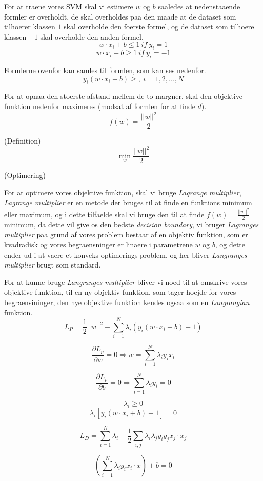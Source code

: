 \documentclass{article}
\begin{document}
For at traene vores SVM skal vi estimere $w$ og $b$ saaledes at nedenstaaende formler er overholdt, de skal overholdes paa den maade at de dataset som tilhoerer klassen $1$ skal overholde den foerste formel, og de dataset som tilhoere klassen $-1$ skal overholde den anden formel. 
$$w \cdot x_i + b \leq 1 \ if \ y_i = 1$$
$$w \cdot x_i + b \geq 1 \ if \ y_i = -1$$

Formlerne ovenfor kan samles til formlen, som kan ses nedenfor. 
$$y_i(w \cdot x_i + b) \geq, \ i =1,2,...,N$$

For at opnaa den stoerste afstand mellem de to margner, skal den objektive funktion nedenfor maximeres (modsat af formlen for at finde $d$).  
$$f(w)=\frac{||w||^2}{2}$$

(Definition)
$$\min\limits_{w} \frac{||w||^2}{2}$$

(Optimering)

For at optimere vores objektive funktion, skal vi bruge \textit{Lagrange multiplier}, \textit{Lagrange multiplier} er en metode der bruges til at finde en funktions minimum eller maximum, og i dette tilfaelde skal vi bruge den til at finde $f(w)=\frac{||w||^2}{2}$ minimum, da dette vil give os den bedste \textit{decision boundary}, vi bruger \textit{Lagranges multiplier} paa grund af vores problem bestaar af en objektiv funktion, som er kvadradisk og vores begraensninger er linaere i parametrene $w$ og $b$, og dette ender ud i at vaere et konveks optimerings problem, og her bliver \textit{Langranges multiplier} brugt som standard.

For at kunne bruge \textit{Langranges multiplier} bliver vi noed til at omskrive vores objektive funktion, til en ny objektiv funktion, som tager hoejde for vores begraensininger, den nye objektive funktion kendes ogsaa som en \textit{Langrangian} funktion.
$$L_P = \frac{1}{2}||w||^2 - \sum\limits_{i=1}^N \lambda_i (y_i(w \cdot x_i + b) - 1)$$


$$\frac{\partial L_p}{\partial w} = 0 \Rightarrow w = \sum\limits_{i=1}^N \lambda_i y_i x_i$$

$$\frac{\partial L_p}{\partial b} = 0 \Rightarrow \sum\limits_{i=1}^N \lambda_i y_i = 0$$

$$\lambda_i \geq 0$$
$$\lambda_i[y_i(w \cdot x_i + b) - 1] = 0$$

$$L_D = \sum\limits_{i=1}^N \lambda_i - \frac{1}{2}\sum\limits_{i,j} \lambda_i \lambda_j y_i y_j x_j \cdot x_j$$

$$( \sum\limits_{i=1}^N \lambda_i y_i x_i \cdot x) + b = 0$$
\end{document}
